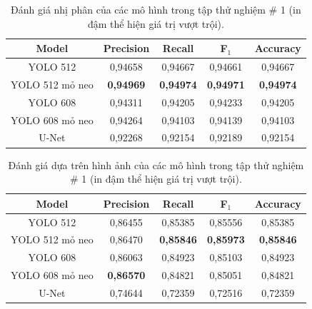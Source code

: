 \documentclass[../the.tex]{subfiles}
\begin{document}
\begin{table}[ht!]
\centering
\caption{Đánh giá nhị phân của các mô hình trong tập thử nghiệm \# 1 (in đậm thể hiện giá trị vượt trội).}
\begin{tabular}{ccccc}
\hline
\textbf{Model}
& \textbf{Precision}
& \textbf{Recall}  
& \textbf{F$_{1}$} 
& \textbf{Accuracy} 
\\ \hline 
YOLO 512           & 0,94658       & 0,94667   & 0,94661    & 0,94667     \\  \hline
YOLO 512 mỏ neo   & \textbf{0,94969}       & \textbf{0,94974}   & \textbf{0,94971}    & \textbf{0,94974}     \\  \hline
YOLO 608           & 0,94311       & 0,94205   & 0,94233    & 0,94205     \\  \hline
YOLO 608 mỏ neo   & 0,94264       & 0,94103   & 0,94139    & 0,94103     \\  \hline
U-Net              & 0,92268       & 0,92154   & 0,92189    & 0,92154     \\  \hline

\end{tabular}
\label{tab:binary}

\end{table}


\begin{table}[h!]
\centering
\caption{Đánh giá dựa trên hình ảnh của các mô hình trong tập thử nghiệm \# 1 (in đậm thể hiện giá trị vượt trội).}
\begin{tabular}{|c|c|c|c|c|}
\hline
\textbf{Model}
& \textbf{Precision}
& \textbf{Recall}  
& \textbf{F$_{1}$} 
& \textbf{Accuracy} 
\\ \hline 
YOLO 512           & 0,86455       & 0,85385   & 0,85556    & 0,85385     \\  \hline
YOLO 512 mỏ neo   & 0,86470       & \textbf{0,85846}   & \textbf{0,85973}    & \textbf{0,85846}     \\  \hline
YOLO 608           & 0,86063       & 0,84923   & 0,85103    & 0,84923     \\  \hline
YOLO 608 mỏ neo   & \textbf{0,86570}       & 0,84821   & 0,85051    & 0,84821     \\  \hline
U-Net              & 0,74644       & 0,72359   & 0,72516    & 0,72359     \\  \hline


\end{tabular}
\label{tab:image}
\end{table}
\end{document}

